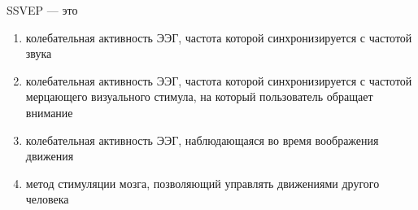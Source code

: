 
SSVEP — это

\begin{enumerate}
    \item колебательная активность ЭЭГ, частота которой синхронизируется с частотой звука
    \item колебательная активность ЭЭГ, частота которой синхронизируется с частотой мерцающего визуального стимула, на который пользователь обращает внимание
    \item колебательная активность ЭЭГ, наблюдающаяся во время воображения движения
    \item метод стимуляции мозга, позволяющий управлять движениями другого человека
\end{enumerate}
